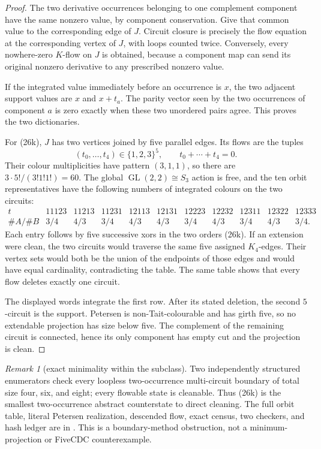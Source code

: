 \documentclass[11pt]{article}
\theoremstyle{definition}
\theoremstyle{remark}
\newtheorem{remark}[theorem]{Remark}
\begin{document}
\begin{proof}
The two derivative occurrences belonging to one complement component
have the same nonzero value, by component conservation.  Give that common
value to the corresponding edge of \(J\).  Circuit closure is precisely
the flow equation at the corresponding vertex of \(J\), with loops counted
twice.  Conversely, every nowhere-zero \(K\)-flow on \(J\) is obtained,
because a component map can send its original nonzero derivative to any
prescribed nonzero value.

If the integrated value immediately before an occurrence is \(x\), the
two adjacent support values are \(x\) and \(x+t_a\).  The parity vector
seen by the two occurrences of component \(a\) is zero exactly when these
two unordered pairs agree.  This proves the two dictionaries.

For (26k), \(J\) has two vertices joined by five parallel edges.  Its
flows are the tuples
\[
 (t_0,\ldots,t_4)\in\{1,2,3\}^5,\qquad
                    t_0+\cdots+t_4=0.                 \tag{26l}
\]
Their colour multiplicities have pattern \((3,1,1)\), so there are
\(3\cdot 5!/(3!1!1!)=60\).  The global
\(\operatorname{GL}(2,2)\cong S_3\) action is free, and the ten orbit
representatives have the following numbers of integrated colours on the
two circuits:
\[
\begin{array}{c|cccccccccc}
t&
11123&11213&11231&12113&12131&
12223&12232&12311&12322&12333\\ \hline
\#A/\#B&
3/4&4/3&3/4&4/3&4/3&3/4&4/3&3/4&4/3&3/4 .
\end{array}
\]
Each entry follows by five successive xors in the two orders (26k).
If an extension were clean, the two circuits would traverse the same five
assigned \(K_4\)-edges.  Their vertex sets would both be the union of the
endpoints of those edges and would have equal cardinality, contradicting
the table.  The same table shows that every flow deletes exactly one
circuit.

The displayed words integrate the first row.  After its stated deletion,
the second \(5\)-circuit is the support.  Petersen is non-Tait-colourable
and has girth five, so no extendable projection has size below five.
The complement of the remaining circuit is connected, hence its only
component has empty cut and the projection is clean.
\end{proof}

\begin{remark}[exact minimality within the subclass]
Two independently structured enumerators check every loopless
two-occurrence multi-circuit boundary of total size four, six, and eight;
every flowable state is cleanable.  Thus (26k) is the smallest
two-occurrence abstract counterstate to direct cleaning.  The full orbit
table, literal Petersen realization, descended flow, exact census, two
checkers, and hash ledger are in
.
This is a boundary-method obstruction, not a minimum-projection or
FiveCDC counterexample.
\end{remark}
\end{document}
